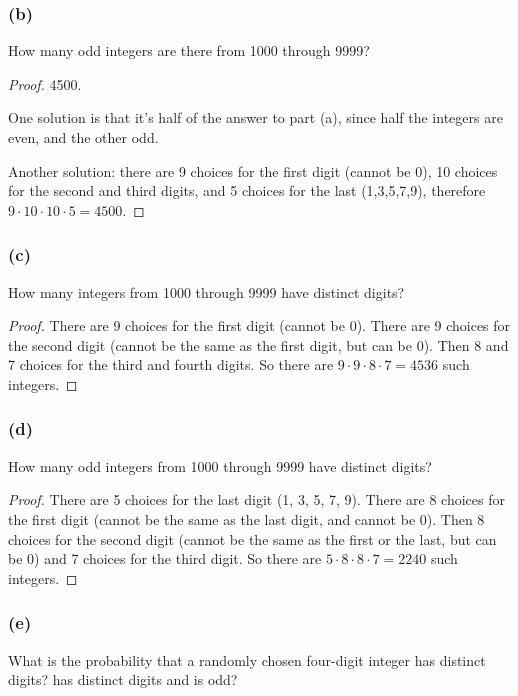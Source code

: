 \documentclass[14pt]{extarticle}
\begin{document}
\subsubsection{(b)}
How many odd integers are there from 1000 through 9999?

\begin{proof}
     4500.

     One solution is that it's half of the answer to part (a), since half the integers are even, and the other odd.

     Another solution: there are 9 choices for the first digit (cannot be 0), 10 choices for the second and third digits,
     and 5 choices for the last (1,3,5,7,9), therefore \(9 \cdot 10 \cdot 10 \cdot 5 = 4500\).
\end{proof}

\subsubsection{(c)}
How many integers from 1000 through 9999 have distinct digits?

\begin{proof}
     There are 9 choices for the first digit (cannot be 0). There are 9 choices for the second digit (cannot be the same as the first digit, but can be 0). Then 8 and 7 choices for the third and fourth digits. So there are
     \(9 \cdot 9 \cdot 8 \cdot 7 = 4536\) such integers.
\end{proof}

\subsubsection{(d)}
How many odd integers from 1000 through 9999 have distinct digits?

\begin{proof}
     There are 5 choices for the last digit (1, 3, 5, 7, 9). There are 8 choices for the first digit (cannot be the
     same as the last digit, and cannot be 0). Then 8 choices for the second digit (cannot be the same as the first or
     the last, but can be 0) and 7 choices for the third digit. So there are \(5 \cdot 8 \cdot 8 \cdot 7 = 2240\) such
     integers.
\end{proof}

\subsubsection{(e)}
What is the probability that a randomly chosen four-digit integer has distinct digits? has distinct digits and is odd?
\end{document}
